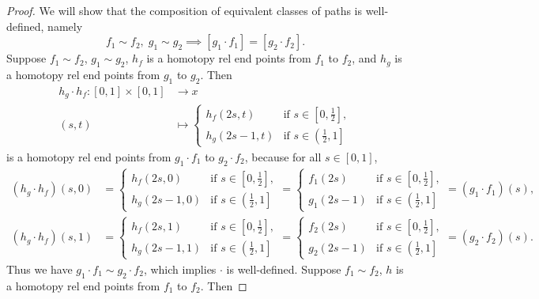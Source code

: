 \documentclass{report}
\theoremstyle{nonumberplain}
\newtheorem{proof}{Proof.}
\begin{document}
\begin{proof}
	We will show that the composition of equivalent classes of paths is                                                                  well-defined, namely 
	\[
		f_1\sim f_2,\;g_1\sim g_2\implies [g_1\cdot f_1] = [g_2\cdot f_2].
	\]
	Suppose $f_1\sim f_2$, $g_1\sim g_2$, $h_f$ is a homotopy rel end points from $f_1$ to $f_2$, and $h_g$ is a homotopy rel end points from $g_1$ to $g_2$. Then
	\begin{align*}
		h_g\cdot h_f:[0,1]\times [0,1] &\longrightarrow x\\
		(s,t) &\longmapsto \begin{cases}
			h_f(2s, t)&\text{if }s\in\left[0,\frac{1}{2}\right],\\
			h_g(2s-1, t)&\text{if }s\in\left(\left.\frac{1}{2},1\right]\right.
		\end{cases}
	\end{align*}
	is a homotopy rel end points from $g_1\cdot f_1$ to $g_2\cdot f_2$, because for all $s\in[0,1]$,
	\[\begin{aligned}
		\left(h_g\cdot h_f\right)(s, 0)&=\begin{cases}
			h_f(2s, 0)&\text{if }s\in\left[0,\frac{1}{2}\right],\\
			h_g(2s-1, 0)&\text{if }s\in\left(\left.\frac{1}{2},1\right]\right.
		\end{cases}=\begin{cases}
			f_1(2s)&\text{if }s\in\left[0,\frac{1}{2}\right],\\
			g_1(2s-1)&\text{if }s\in\left(\left.\frac{1}{2},1\right]\right.
		\end{cases}=\left(g_1\cdot f_1\right)(s),\\
		\left(h_g\cdot h_f\right)(s, 1)&=\begin{cases}
			h_f(2s, 1)&\text{if }s\in\left[0,\frac{1}{2}\right],\\
			h_g(2s-1, 1)&\text{if }s\in\left(\left.\frac{1}{2},1\right]\right.
		\end{cases}=\begin{cases}
			f_2(2s)&\text{if }s\in\left[0,\frac{1}{2}\right],\\
			g_2(2s-1)&\text{if }s\in\left(\left.\frac{1}{2},1\right]\right.
		\end{cases}=\left(g_2\cdot f_2\right)(s).
	\end{aligned}\]
	Thus we have $g_1\cdot f_1\sim g_2\cdot f_2$, which implies $\cdot$ is well-defined.
	Suppose $f_1\sim f_2$, $h$ is a homotopy rel end points from $f_1$ to $f_2$. Then

\end{proof}
\end{document}
